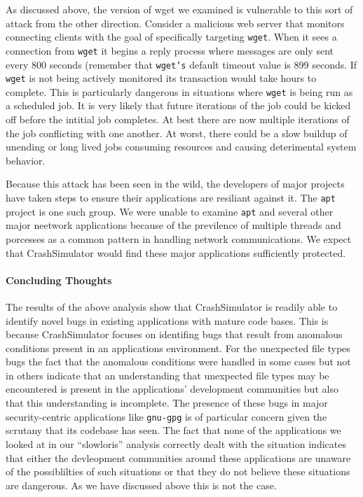 As discussed above, the version of wget we examined is vulnerable to this sort
of attack from the other direction.  Consider a malicious web server that
monitors connecting clients with the goal of specifically targeting {\tt wget}.
When it sees a connection from {\tt wget} it begins a reply process where
messages are only sent every 800 seconds (remember that {\tt wget's} default
timeout value is 899 seconds.  If {\tt wget} is not being actively monitored its
transaction would take hours to complete.  This is particularly dangerous in
situations where {\tt wget} is being run as a scheduled job.  It is very likely
that future iterations of the job could be kicked off before the intitial job
completes.  At best there are now multiple iterations of the job conflicting
with one another.  At worst, there could be a slow buildup of unending or long
lived jobs consuming resources and causing deterimental system behavior.

Because this attack has been seen in the wild, the developers of major projects
have taken steps to ensure their applications are resiliant against it.  The
{\tt apt} project is one such group.  We were unable to examine {\tt apt} and
several other major neetwork applications because of the previlence of multiple
threads and porcesses as a common pattern in handling network communications.
We expect that CrashSimulator would find these major applications sufficiently
protected.


\paragraph{Concluding Thoughts}
The results of the above analysis show that CrashSimulator is readily able to
identify novel bugs in existing applications with mature code bases.  This is
because CrashSimulator focuses on identifing bugs that result from anomalous
conditions present in an applications environment.  For the unexpected file
types bugs the fact that the anomalous conditions were handled in some cases but
not in others indicate that an understanding that unexpected file types may be
encountered is present in the applications' development communities but also
that this understanding is incomplete.  The presence of these bugs in major
security-centric applications like {\tt gnu-gpg} is of particular concern given
the scrutany that its codebase has seen.  The fact that none of the applications
we looked at in our ``slowloris'' analysis correctly dealt with the situation
indicates that either the devleopment communities around these applications are
unaware of the possiblilties of such situations or that they do not believe
these situations are dangerous.  As we have discussed above this is not the
case.


